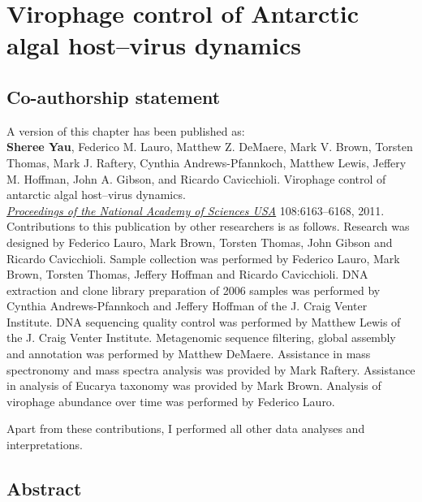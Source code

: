 \chapter{Virophage control of Antarctic algal host--virus dynamics}
\label{ch:olv}

\section*{Co-authorship statement}

A version of this chapter has been published as:\\

\textbf{Sheree Yau}, Federico M. Lauro, Matthew Z. DeMaere, Mark V. Brown, Torsten Thomas,
Mark J. Raftery, Cynthia Andrews-Pfannkoch, Matthew Lewis, Jeffery M. Hoffman, John A. Gibson, and
Ricardo Cavicchioli.
Virophage control of antarctic algal host--virus dynamics.\\
\emph{\underline{Proceedings of the National Academy of Sciences USA}}
108:6163--6168, 2011.\\

Contributions to this publication by other researchers is as follows.
Research was designed by Federico Lauro, Mark Brown, Torsten Thomas, John Gibson and Ricardo Cavicchioli.
Sample collection was performed by Federico Lauro, Mark Brown, Torsten Thomas, Jeffery Hoffman and Ricardo Cavicchioli.
DNA extraction and clone library preparation of 2006 samples was performed by Cynthia Andrews-Pfannkoch and Jeffery Hoffman of the J. Craig Venter Institute.
DNA sequencing quality control was performed by Matthew Lewis of the J. Craig Venter Institute.
Metagenomic sequence filtering, global assembly and annotation was performed by Matthew DeMaere.
Assistance in mass spectronomy and mass spectra analysis was provided by Mark Raftery.
Assistance in analysis of Eucarya taxonomy was provided by Mark Brown.
Analysis of virophage abundance over time was performed by Federico Lauro.

Apart from these contributions, I performed all other data analyses and interpretations.
\newpage


\section{Abstract}

